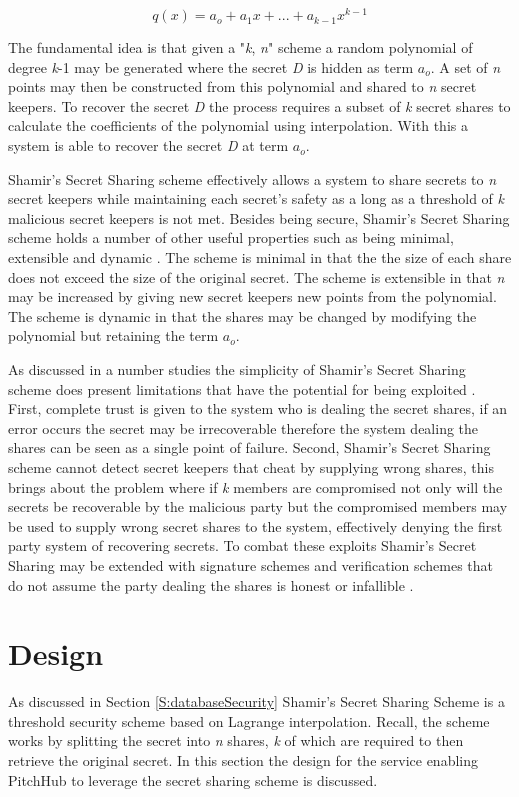 \[q(x) = a_o +a_1x + ... + a_{k-1}x^{k-1} \]

The fundamental idea is that given a "\textit{k}, \textit{n}" scheme a random polynomial of degree \textit{k}-1 may be generated where the secret \textit{D} is hidden as term \(a_o\). A set of \textit{n} points may then be constructed from this polynomial and shared to \textit{n} secret keepers. To recover the secret \textit{D} the process requires a subset of \textit{k} secret shares to calculate the coefficients of the polynomial using interpolation. With this a system is able to recover the secret \textit{D} at term \(a_o\).
\par
Shamir's Secret Sharing scheme effectively allows a system to share secrets to \textit{n} secret keepers while maintaining each secret's safety as a long as a threshold of \textit{k} malicious secret keepers is not met. Besides being secure, Shamir's Secret Sharing scheme holds a number of other useful properties such as being minimal, extensible and dynamic \cite{shamir1979share}. The scheme is minimal in that the the size of each share does not exceed the size of the original secret. The scheme is extensible in that \textit{n} may be increased by giving new secret keepers new points from the polynomial. The scheme is dynamic in that the shares may be changed by modifying the polynomial but retaining the term \(a_o\).
\par
As discussed in a number studies the simplicity of Shamir's Secret Sharing scheme does present limitations that have the potential for being exploited \cite{abdallah2015analysis}\cite{dautrich2012security}. First, complete trust is given to the system who is dealing the secret shares, if an error occurs the secret may be irrecoverable therefore the system dealing the shares can be seen as a single point of failure. Second, Shamir's Secret Sharing scheme cannot detect secret keepers that cheat by supplying wrong shares, this brings about the problem where if \textit{k} members are compromised not only will the secrets be recoverable by the malicious party but the compromised members may be used to supply wrong secret shares to the system, effectively denying the first party system of recovering secrets. To combat these exploits Shamir's Secret Sharing may be extended with signature schemes \cite{shoup2000practical}\cite{abdalla2001forward} and verification schemes that do not assume the party dealing the shares is honest or infallible \cite{herzberg1995proactive}\cite{cachin2002asynchronous}.

\section{Design}
As discussed in Section \ref{S:databaseSecurity} Shamir's Secret Sharing Scheme is a threshold security scheme based on Lagrange interpolation. Recall, the scheme works by splitting the secret into \textit{n} shares, \textit{k} of which are required to then retrieve the original secret. In this section the design for the service enabling PitchHub to leverage the secret sharing scheme is discussed.

